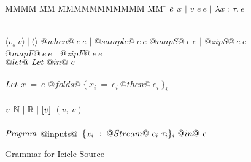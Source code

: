
\begin{figure}

\begin{tabbing}
MMMM \= MM \= MMMMMMMMMMM \= MM \= \kill
$\mathit{e}$
\GrammarDef $x$
\> $|$ \> $v$
\GrammarAlt $e~e$
\> $|$ \> $\lambda{}x~:~\tau.~e$

\\
\GrammarAlt $\langle v_s ~ v \rangle ~|~ \langle\rangle$
\GrammarAlt $@when@~e~e$
\> $|$ \> $@sample@~e~e$
\GrammarAlt $@mapS@~e~e$
\> $|$ \> $@zipS@~e~e$
\GrammarAlt $@mapF@~e~e$
\> $|$ \> $@zipF@~e~e$
\\
\GrammarAlt $@let@~\mathit{Let}~@in@~e$
\\
\\

$\mathit{Let}$
\GrammarDef $x~=~e$
\GrammarAlt $@folds@~\{~x_i~=~e_i~@then@~e_i~\}_i$
\\
\\

$\mathit{v}$
\GrammarDef $\mathbb{N} ~|~ \mathbb{B} ~|~ [v]$
\GrammarAlt $(v,~v)$
\\
\\


$\mathit{Program}$
\GrammarDef @inputs@~$\{ x_i~:~@Stream@~c_i~\tau_i \}_i~@in@~\mathit{e}$ \\
\end{tabbing}

\caption{Grammar for Icicle Source}
\label{fig:source:grammar}
\end{figure}

